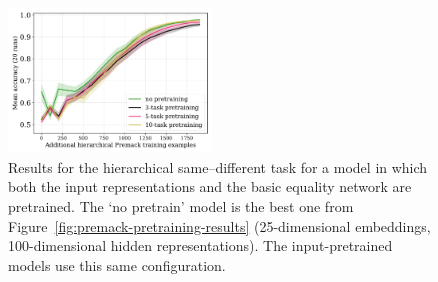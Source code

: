 \documentclass{article}
\newcommand{\figref}[1]{Figure~\ref{#1}}
\begin{document}
\begin{figure}[H]
  \centering
  \includegraphics[width=0.48\textwidth]{./input-as-output-pretrain-compare-train_size-pretrained-embed_dim=None.pdf}
  \caption{Results for the hierarchical same--different task for a model in which both the input representations and the basic equality network are pretrained. The `no pretrain' model is the best one from \figref{fig:premack-pretraining-results} (25-dimensional embeddings, 100-dimensional hidden representations). The input-pretrained models use this same configuration.}
  \label{fig:double-pretrain}
\end{figure}
\end{document}
